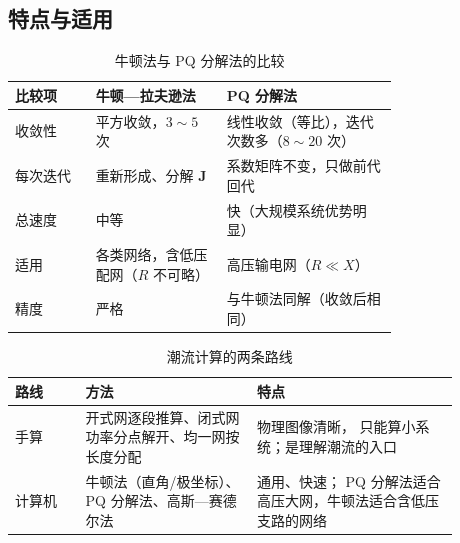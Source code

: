 \subsection{特点与适用}

\begin{table}[htbp]
  \centering
  \caption{牛顿法与 PQ 分解法的比较}
  \small
  \begin{tabular}{@{}p{0.16\linewidth}p{0.26\linewidth}p{0.34\linewidth}@{}}
    \toprule
    比较项 & 牛顿—拉夫逊法 & PQ 分解法 \\
    \midrule
    收敛性 & 平方收敛，$3\sim5$ 次 & 线性收敛（等比），迭代次数多（$8\sim20$ 次） \\
    每次迭代 & 重新形成、分解 $\boldsymbol J$ & 系数矩阵不变，只做前代回代 \\
    总速度 & 中等 & 快（大规模系统优势明显） \\
    适用 & 各类网络，含低压配网（$R$ 不可略） & 高压输电网（$R\ll X$） \\
    精度 & 严格 & 与牛顿法同解（收敛后相同） \\
    \bottomrule
  \end{tabular}
\end{table}

\begin{table}[htbp]
  \centering
  \caption{潮流计算的两条路线}
  \small
  \begin{tabular}{@{}p{0.14\linewidth}p{0.34\linewidth}p{0.40\linewidth}@{}}
    \toprule
    路线 & 方法 & 特点 \\
    \midrule
    手算 & 开式网逐段推算、闭式网功率分点解开、均一网按长度分配 & 物理图像清晰，
      只能算小系统；是理解潮流的入口 \\
    计算机 & 牛顿法（直角/极坐标）、PQ 分解法、高斯—赛德尔法 & 通用、快速；
      PQ 分解法适合高压大网，牛顿法适合含低压支路的网络 \\
    \bottomrule
  \end{tabular}
\end{table}

